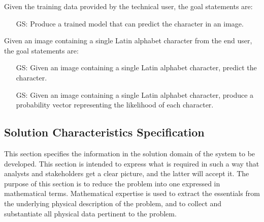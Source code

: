 \documentclass[12pt]{article}
\newcounter{goalnum} %
\begin{document}
\noindent Given the training data provided by the technical user, the goal
statements are:

\begin{itemize}

\item[GS\refstepcounter{goalnum}\thegoalnum \label{G_train}:] Produce a trained
model that can predict the character in an image.

\end{itemize}

\noindent Given an image containing a single Latin alphabet character from the
end user, the goal statements are:

\begin{itemize}

\item[GS\refstepcounter{goalnum}\thegoalnum \label{G_predict}:] Given an image
containing a single Latin alphabet character, predict the character.
\item[GS\refstepcounter{goalnum}\thegoalnum \label{G_probability}:] Given an
image containing a single Latin alphabet character, produce a probability vector
representing the likelihood of each character.

\end{itemize}

\subsection{Solution Characteristics Specification}

This section specifies the information in the solution domain of the system
to be developed. This section is intended to express what is required in
such a way that analysts and stakeholders get a clear picture, and the
latter will accept it. The purpose of this section is to reduce the problem
into one expressed in mathematical terms. Mathematical expertise is used to
extract the essentials from the underlying physical description of the
problem, and to collect and substantiate all physical data pertinent to the
problem.

\end{document}
